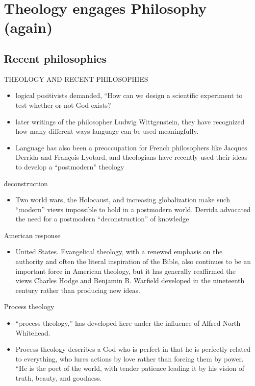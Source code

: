 \section{Theology engages Philosophy (again)}
\label{sec-3}
\subsection{Recent philosophies}
\label{sec-3-1}
\begin{frame}[label=sec-3-1-1]{THEOLOGY AND RECENT PHILOSOPHIES}
\begin{itemize}
\item logical positivists demanded, “How can we design a scientific experiment to test whether or not God exists?
\item later writings of the philosopher Ludwig Wittgenstein, they have recognized how many different ways language can be used meaningfully.
\item Language has also been a preoccupation for French philosophers like Jacques Derrida and François Lyotard, and theologians have recently used their ideas to develop a “postmodern” theology
\end{itemize}
\end{frame}

\begin{frame}[label=sec-3-1-2]{deconstruction}
\begin{itemize}
\item Two world wars, the Holocaust, and increasing globalization make such “modern” views impossible to hold in a postmodern world. Derrida advocated the need for a postmodern “deconstruction” of knowledge
\end{itemize}
\end{frame}

\begin{frame}[label=sec-3-1-3]{American response}
\begin{itemize}
\item United States. Evangelical theology, with a renewed emphasis on the authority and often the literal inspiration of the Bible, also continues to be an important force in American theology, but it has generally reaffirmed the views Charles Hodge and Benjamin B. Warfield developed in the nineteenth century rather than producing new ideas.
\end{itemize}
\end{frame}

\begin{frame}[label=sec-3-1-4]{Process theology}
\begin{itemize}
\item “process theology,” has developed here under the influence of Alfred North Whitehead.
\item Process theology describes a God who is perfect in that he is perfectly related to everything, who lures actions by love rather than forcing them by power. “He is the poet of the world, with tender patience leading it by his vision of truth, beauty, and goodness.
\end{itemize}
\end{frame}

